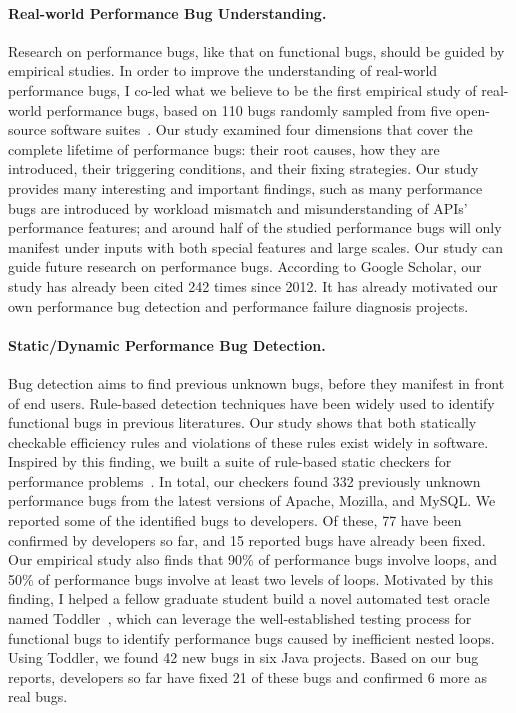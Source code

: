 \documentclass[10pt]{article}
\begin{document}
\vspace{-.1in}
\paragraph{Real-world Performance Bug Understanding.}
Research on performance bugs, like that on functional bugs, 
should be guided by empirical studies. 
In order to improve the understanding of real-world performance bugs, 
I co-led what we believe to be the first 
empirical study of real-world performance bugs, 
based on 110 bugs randomly sampled from five open-source software suites~\cite{jin12perfbug}. 
Our study examined four dimensions 
that cover the complete lifetime of performance bugs:
their root causes, 
how they are introduced, their triggering conditions, and their fixing strategies. 
Our study provides many interesting and important findings, 
such as many performance bugs are introduced by workload mismatch 
and misunderstanding of APIs' performance features; 
and around half of the studied performance bugs 
will only manifest under inputs with both special features and large scales. 
Our study can guide future research on performance bugs.
According to Google Scholar, our study has already been cited 
242 times since 2012. 
It has already motivated our own performance bug detection 
and performance failure diagnosis projects.



\vspace{-.1in}
\paragraph{Static/Dynamic Performance Bug Detection.}
Bug detection aims to find previous unknown bugs,
before they manifest in front of end users. 
Rule-based detection techniques have been widely used to identify 
functional bugs in previous literatures.
Our study shows that both statically checkable efficiency rules 
and violations of these rules exist widely in software. 
Inspired by this finding,
we built a suite of rule-based static checkers for performance problems~\cite{jin12perfbug}.
In total, our checkers found 332 previously unknown performance bugs 
from the latest versions of Apache, Mozilla, and MySQL. 
We reported some of the identified bugs to developers. 
Of these, 77 have been confirmed by developers so far, 
and 15 reported bugs have already been fixed.
Our empirical study also finds that 90\% of performance bugs involve loops, 
and 50\% of performance bugs involve at least two levels of loops. 
Motivated by this finding, I helped a fellow graduate student 
build a novel automated test oracle named Toddler~\cite{Nistor13ICSE},
which can leverage the well-established testing process for functional bugs to 
identify performance bugs caused by inefficient nested loops. 
Using Toddler, we found 42 new bugs in six Java projects.
Based on our bug reports, developers so far have fixed 21 of these bugs 
and confirmed 6 more as real bugs. 
\end{document}
